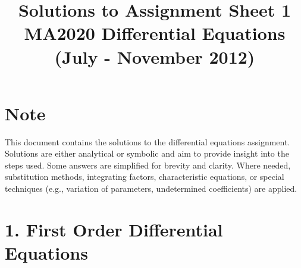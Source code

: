 \documentclass[12pt]{article}
\title{Solutions to Assignment Sheet 1\\ \large MA2020 Differential Equations (July - November 2012)}
\date{}
\begin{document}
\maketitle

\section*{Note}
This document contains the solutions to the differential equations assignment. Solutions are either analytical or symbolic and aim to provide insight into the steps used. Some answers are simplified for brevity and clarity. Where needed, substitution methods, integrating factors, characteristic equations, or special techniques (e.g., variation of parameters, undetermined coefficients) are applied.

\section*{1. First Order Differential Equations}
\end{document}
